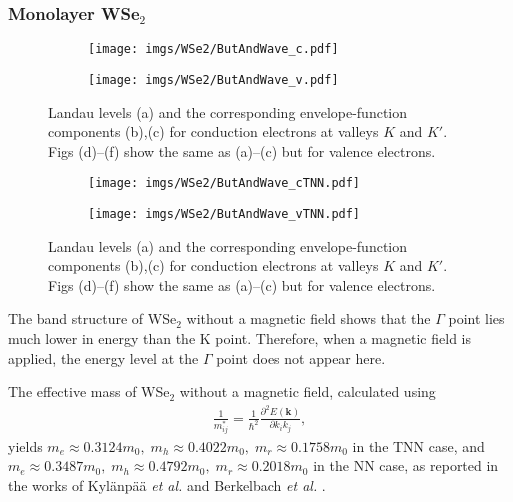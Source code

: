 \documentclass{article}
\begin{document}
\subsubsection*{Monolayer WSe$_{2}$}
\begin{figure}[htb]
	\begin{subfigure}{0.495\textwidth}
		\centering
		\texttt{[image: imgs/WSe2/ButAndWave\_c.pdf]}
	\end{subfigure}
	\begin{subfigure}{0.495\textwidth}
		\centering
		\texttt{[image: imgs/WSe2/ButAndWave\_v.pdf]}
	\end{subfigure}
	\caption{Landau levels (a) and the corresponding envelope-function components (b),(c) for conduction electrons at valleys $K$ and $K'$. Figs (d)–(f) show the same as (a)–(c) but for valence electrons.}
\end{figure}
\begin{figure}[!h]
	\begin{subfigure}{0.495\textwidth}
		\centering
		\texttt{[image: imgs/WSe2/ButAndWave\_cTNN.pdf]}
	\end{subfigure}
	\begin{subfigure}{0.495\textwidth}
		\centering
		\texttt{[image: imgs/WSe2/ButAndWave\_vTNN.pdf]}
	\end{subfigure}
	\caption{Landau levels (a) and the corresponding envelope-function components (b),(c) for conduction electrons at valleys $K$ and $K'$. Figs (d)–(f) show the same as (a)–(c) but for valence electrons.}
\end{figure}
The band structure of WSe$_{2}$ without a magnetic field shows that the $\Gamma$ point lies much lower in energy than the K point. Therefore, when a magnetic field is applied, the energy level at the $\Gamma$ point does not appear here.

The effective mass of WSe$_{2}$ without a magnetic field, calculated using
\begin{gather}
	\frac{1}{m_{ij}^{*}} = \frac{1}{\hbar^{2}} \frac{\partial^{2} E(\mathbf{k})}{\partial k_{i} k_{j}},
\end{gather}
yields $m_{e} \approx 0.3124 m_{0},\; m_{h} \approx 0.4022 m_{0},\; m_{r} \approx 0.1758 m_{0}$ in the TNN case, and $m_{e} \approx 0.3487 m_{0},\; m_{h} \approx 0.4792 m_{0},\; m_{r} \approx 0.2018 m_{0}$ in the NN case, as reported in the works of Kyl\"{a}np\"{a}\"{a} \textit{et al.} and Berkelbach \textit{et al.} \cite{berkelbach2013,kylanpaa2015}.
\end{document}
